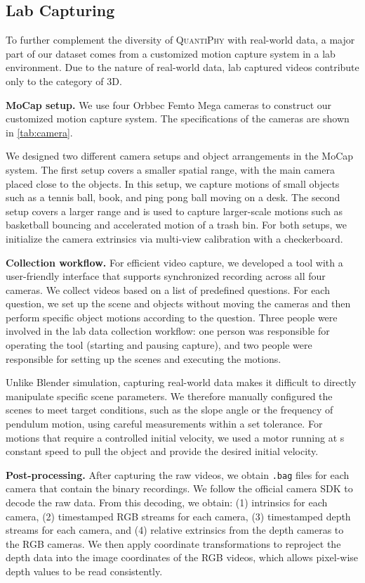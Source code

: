 \subsection{Lab Capturing}

To further complement the diversity of \textsc{QuantiPhy} with real-world data, a major part of our dataset comes from a customized motion capture system in a lab environment. Due to the nature of real-world data, lab captured videos contribute only to the category of 3D.

\noindent\textbf{MoCap setup.} 
We use four Orbbec Femto Mega cameras to construct our customized motion capture system. The specifications of the cameras are shown in \autoref{tab:camera}.

We designed two different camera setups and object arrangements in the MoCap system. The first setup covers a smaller spatial range, with the main camera placed close to the objects. In this setup, we capture motions of small objects such as a tennis ball, book, and ping pong ball moving on a desk. The second setup covers a larger range and is used to capture larger-scale motions such as basketball bouncing and accelerated motion of a trash bin. For both setups, we initialize the camera extrinsics via multi-view calibration with a checkerboard.

\noindent\textbf{Collection workflow.} 
For efficient video capture, we developed a tool with a user-friendly interface that supports synchronized recording across all four cameras. We collect videos based on a list of predefined questions. For each question, we set up the scene and objects without moving the cameras and then perform specific object motions according to the question. Three people were involved in the lab data collection workflow: one person was responsible for operating the tool (starting and pausing capture), and two people were responsible for setting up the scenes and executing the motions.

Unlike Blender simulation, capturing real-world data makes it difficult to directly manipulate specific scene parameters. We therefore manually configured the scenes to meet target conditions, such as the slope angle or the frequency of pendulum motion, using careful measurements within a set tolerance. For motions that require a controlled initial velocity, we used a motor running at s constant speed to pull the object and provide the desired initial velocity.

\noindent\textbf{Post-processing.} 
After capturing the raw videos, we obtain \texttt{.bag} files for each camera that contain the binary recordings. We follow the official camera SDK to decode the raw data. From this decoding, we obtain: (1) intrinsics for each camera, (2) timestamped RGB streams for each camera, (3) timestamped depth streams for each camera, and (4) relative extrinsics from the depth cameras to the RGB cameras. We then apply coordinate transformations to reproject the depth data into the image coordinates of the RGB videos, which allows pixel-wise depth values to be read consistently.

